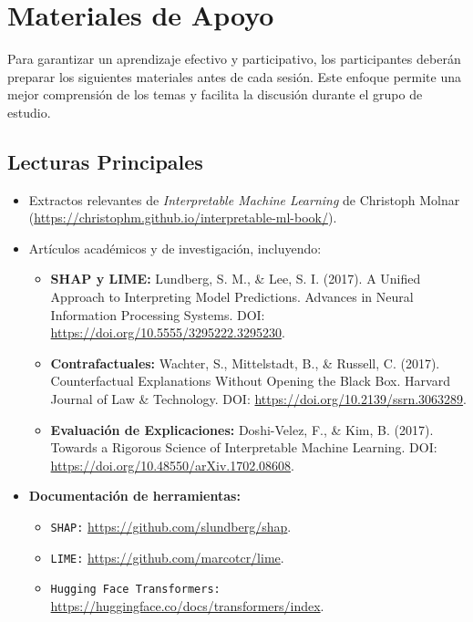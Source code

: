 \section*{Materiales de Apoyo}
Para garantizar un aprendizaje efectivo y participativo, los participantes deberán preparar los siguientes materiales antes de cada sesión. Este enfoque permite una mejor comprensión de los temas y facilita la discusión durante el grupo de estudio.

\subsection*{Lecturas Principales}
\begin{itemize}
    \item Extractos relevantes de \textit{Interpretable Machine Learning} de Christoph Molnar (\url{https://christophm.github.io/interpretable-ml-book/}).
    \item Artículos académicos y de investigación, incluyendo:
    \begin{itemize}
        \item \textbf{SHAP y LIME:} Lundberg, S. M., \& Lee, S. I. (2017). A Unified Approach to Interpreting Model Predictions. Advances in Neural Information Processing Systems. DOI: \url{https://doi.org/10.5555/3295222.3295230}.
        \item \textbf{Contrafactuales:} Wachter, S., Mittelstadt, B., \& Russell, C. (2017). Counterfactual Explanations Without Opening the Black Box. Harvard Journal of Law \& Technology. DOI: \url{https://doi.org/10.2139/ssrn.3063289}.
        \item \textbf{Evaluación de Explicaciones:} Doshi-Velez, F., \& Kim, B. (2017). Towards a Rigorous Science of Interpretable Machine Learning. DOI: \url{https://doi.org/10.48550/arXiv.1702.08608}.
    \end{itemize}
    \item \textbf{Documentación de herramientas:}
    \begin{itemize}
        \item \texttt{SHAP:} \url{https://github.com/slundberg/shap}.
        \item \texttt{LIME:} \url{https://github.com/marcotcr/lime}.
        \item \texttt{Hugging Face Transformers:} \url{https://huggingface.co/docs/transformers/index}.
    \end{itemize}
\end{itemize}

